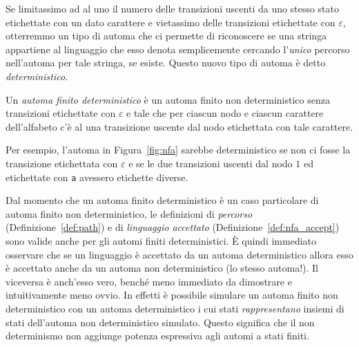 Se limitassimo ad al \piu uno il numero delle transizioni uscenti da uno
stesso stato etichettate con un dato carattere e vietassimo
delle transizioni etichettate con $\varepsilon$, otterremmo un tipo di automa
che ci permette di riconoscere se una stringa appartiene al linguaggio che
esso denota semplicemente cercando l'\emph{unico} percorso nell'automa
per tale stringa, se esiste. Questo nuovo tipo di automa \`e detto
\emph{deterministico}.
%
\begin{definition}\label{def:dfa}
Un \emph{automa finito deterministico} \`e un automa finito
non deterministico senza transizioni etichettate con $\varepsilon$
e tale che per ciascun nodo e ciascun carattere
dell'alfabeto c'\`e al \piu una transizione
uscente dal nodo etichettata con tale carattere.
\end{definition}
%
\noindent
Per esempio, l'automa in Figura~\ref{fig:nfa} sarebbe deterministico se non
ci fosse la transizione etichettata con $\varepsilon$ e se le due
transizioni uscenti dal nodo $1$ ed etichettate con \texttt{a} avessero
etichette diverse.

Dal momento che un automa finito deterministico \`e un caso particolare
di automa finito non deterministico, le definizioni di \emph{percorso}
(Definizione~\ref{def:path}) e di \emph{linguaggio accettato}
(Definizione~\ref{def:nfa_accept}) sono valide anche per gli automi finiti
deterministici. \`E quindi immediato osservare che se un linguaggio \`e
accettato da un automa deterministico allora esso \`e accettato anche da un
automa non deterministico (lo stesso automa!). Il viceversa \`e anch'esso
vero, bench\'e meno immediato da dimostrare e intuitivamente meno ovvio.
In effetti \`e possibile simulare un automa finito non deterministico
con un automa deterministico i cui stati \emph{rappresentano} insiemi di
stati dell'automa non deterministico simulato. Questo significa che il
non determinismo non aggiunge potenza espressiva agli automi a stati finiti.


